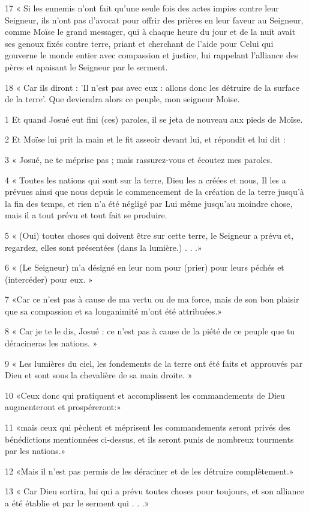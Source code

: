 \par 17 « Si les ennemis n'ont fait qu'une seule fois des actes impies contre leur Seigneur, ils n'ont pas d'avocat pour offrir des prières en leur faveur au Seigneur, comme Moïse le grand messager, qui à chaque heure du jour et de la nuit avait ses genoux fixés contre terre, priant et cherchant de l'aide pour Celui qui gouverne le monde entier avec compassion et justice, lui rappelant l'alliance des pères et apaisant le Seigneur par le serment.
\par 18 « Car ils diront : 'Il n'est pas avec eux : allons donc les détruire de la surface de la terre'. Que deviendra alors ce peuple, mon seigneur Moïse.


\par 1 Et quand Josué eut fini (ces) paroles, il se jeta de nouveau aux pieds de Moïse.
\par 2 Et Moïse lui prit la main et le fit asseoir devant lui, et répondit et lui dit :
\par 3 « Josué, ne te méprise pas ; mais rassurez-vous et écoutez mes paroles.
\par 4 « Toutes les nations qui sont sur la terre, Dieu les a créées et nous, Il les a prévues ainsi que nous depuis le commencement de la création de la terre jusqu'à la fin des temps, et rien n'a été négligé par Lui même jusqu'au moindre chose, mais il a tout prévu et tout fait se produire.
\par 5 « (Oui) toutes choses qui doivent être sur cette terre, le Seigneur a prévu et, regardez, elles sont présentées (dans la lumière.) . . .»
\par 6 « (Le Seigneur) m'a désigné en leur nom pour (prier) pour leurs péchés et (intercéder) pour eux. »
\par 7 «Car ce n'est pas à cause de ma vertu ou de ma force, mais de son bon plaisir que sa compassion et sa longanimité m'ont été attribuées.»
\par 8 « Car je te le dis, Josué : ce n’est pas à cause de la piété de ce peuple que tu déracineras les nations. »
\par 9 « Les lumières du ciel, les fondements de la terre ont été faits et approuvés par Dieu et sont sous la chevalière de sa main droite. »
\par 10 «Ceux donc qui pratiquent et accomplissent les commandements de Dieu augmenteront et prospéreront:»
\par 11 «mais ceux qui pèchent et méprisent les commandements seront privés des bénédictions mentionnées ci-dessus, et ils seront punis de nombreux tourments par les nations.»
\par 12 «Mais il n'est pas permis de les déraciner et de les détruire complètement.»
\par 13 « Car Dieu sortira, lui qui a prévu toutes choses pour toujours, et son alliance a été établie et par le serment qui . . .»

